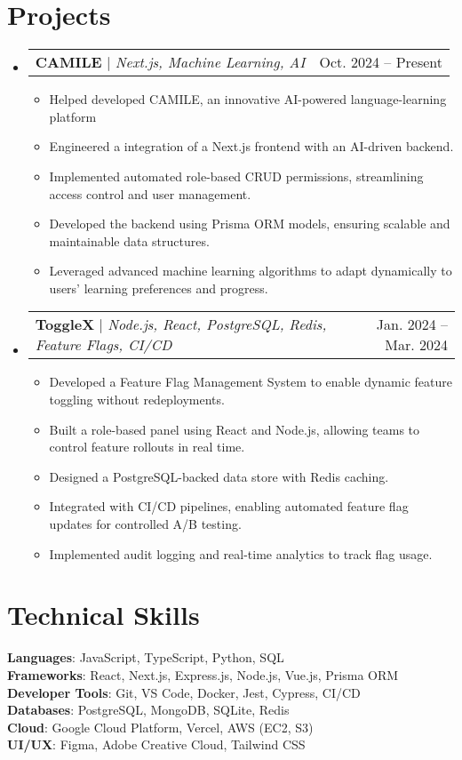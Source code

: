 \documentclass[letterpaper,11pt]{article}
\makeatletter
\newcommand{\resumeItem}[1]{
  \item\small{
    {#1 \vspace{-2pt}}
  }
}
\newcommand{\resumeProjectHeading}[2]{
    \item
    \begin{tabular*}{0.97\textwidth}{l@{\extracolsep{\fill}}r}
      \small#1 & #2 \\
    \end{tabular*}\vspace{-7pt}
}
\newcommand{\resumeItemListStart}{\begin{itemize}}
\newcommand{\resumeItemListEnd}{\end{itemize}\vspace{-5pt}}
\makeatother
\begin{document}
\section{Projects}
  \begin{itemize}[leftmargin=0.15in, label={}]
\resumeProjectHeading
  {\textbf{CAMILE} $|$ \emph{Next.js, Machine Learning, AI}}{Oct. 2024 -- Present}
  \resumeItemListStart
    \resumeItem{Helped developed CAMILE, an innovative AI-powered language-learning platform}
    \resumeItem{Engineered a integration of a Next.js frontend with an AI-driven backend.}
    \resumeItem{Implemented automated role-based CRUD permissions, streamlining access control and user management.}
    \resumeItem{Developed the backend using Prisma ORM models, ensuring scalable and maintainable data structures.}
    \resumeItem{Leveraged advanced machine learning algorithms to adapt dynamically to users’ learning preferences and progress.}
  \resumeItemListEnd

   \resumeProjectHeading
  {\textbf{ToggleX} $|$ \emph{Node.js, React, PostgreSQL, Redis, Feature Flags, CI/CD}}{Jan. 2024 -- Mar. 2024}
  \resumeItemListStart
    \resumeItem{Developed a Feature Flag Management System to enable dynamic feature toggling without redeployments.}
    \resumeItem{Built a role-based panel using React and Node.js, allowing teams to control feature rollouts in real time.}
    \resumeItem{Designed a PostgreSQL-backed data store with Redis caching.}
    \resumeItem{Integrated with CI/CD pipelines, enabling automated feature flag updates for controlled A/B testing.}
    \resumeItem{Implemented audit logging and real-time analytics to track flag usage.}
  \resumeItemListEnd
  \end{itemize}

\section{Technical Skills}
 \begin{itemize}[leftmargin=0.15in, label={}]
    \small{\item{
     \textbf{Languages}{: JavaScript, TypeScript, Python, SQL} \\
     \textbf{Frameworks}{: React, Next.js, Express.js, Node.js, Vue.js, Prisma ORM} \\
     \textbf{Developer Tools}{: Git, VS Code, Docker, Jest, Cypress, CI/CD} \\
     \textbf{Databases}{: PostgreSQL, MongoDB, SQLite, Redis} \\
     \textbf{Cloud}{: Google Cloud Platform, Vercel, AWS (EC2, S3)} \\
     \textbf{UI/UX}{: Figma, Adobe Creative Cloud, Tailwind CSS} \\
    }}
 \end{itemize}


\end{document}
